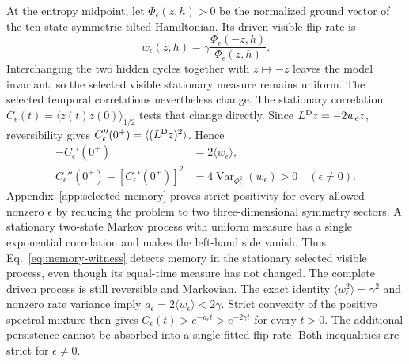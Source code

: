 \documentclass[aps,pre,reprint,amsmath,amssymb,longbibliography,floatfix]{revtex4-2}
\newcommand{\Var}{\operatorname{Var}}
\begin{document}
At the entropy midpoint, let $\Phi_\epsilon(z,h)>0$ be the normalized
ground vector of the ten-state symmetric tilted Hamiltonian. Its driven
visible flip rate is
\begin{equation}
 w_\epsilon(z,h)=\gamma
 \frac{\Phi_\epsilon(-z,h)}{\Phi_\epsilon(z,h)}.
 \label{eq:memory-driven-flip}
\end{equation}
Interchanging the two hidden cycles together with $z\mapsto-z$ leaves
the model invariant, so the selected visible stationary measure remains
uniform. The selected temporal correlations nevertheless change.
The stationary correlation
$C_\epsilon(t)=\langle z(t)z(0)\rangle_{1/2}$ tests that change directly.
Since $L^{\rm D}z=-2w_\epsilon z$, reversibility gives
$C_\epsilon''(0^+)=\langle(L^{\rm D}z)^2\rangle$. Hence
\begin{align}
 -C_\epsilon'(0^+)&=2\langle w_\epsilon\rangle,\\
 C_\epsilon''(0^+)-\left[C_\epsilon'(0^+)\right]^2
 &=4\Var_{\Phi_\epsilon^2}(w_\epsilon)>0
 \quad(\epsilon\ne0).
 \label{eq:memory-witness}
\end{align}
Appendix~\ref{app:selected-memory} proves strict positivity for every
allowed nonzero $\epsilon$ by reducing the problem to two
three-dimensional symmetry sectors. A stationary two-state Markov process with uniform measure has
a single exponential correlation and makes the left-hand side vanish.
Thus Eq.~\eqref{eq:memory-witness} detects memory in the stationary
selected visible process, even though its equal-time measure has not
changed. The complete driven process is still reversible and Markovian.
The exact identity $\langle w_\epsilon^2\rangle=\gamma^2$ and
nonzero rate variance imply
$a_\epsilon=2\langle w_\epsilon\rangle<2\gamma$. Strict convexity
of the positive spectral mixture then gives
$C_\epsilon(t)>e^{-a_\epsilon t}>e^{-2\gamma t}$ for every $t>0$.
The additional persistence cannot be absorbed into a single fitted flip
rate. Both inequalities are strict for $\epsilon\ne0$.
\end{document}
